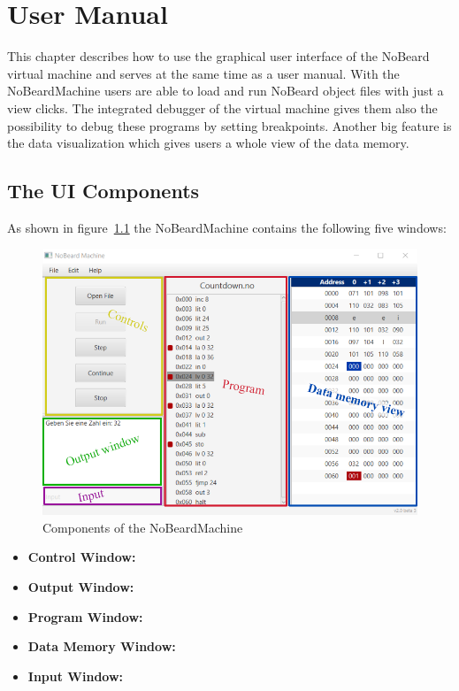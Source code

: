 \chapter{User Manual}
This chapter describes how to use the graphical user interface of the NoBeard virtual machine and serves at the same time as a user manual.
With the NoBeardMachine users are able to load and run NoBeard object files with just a view clicks. The integrated debugger of the virtual machine gives them also the possibility to debug these programs by setting breakpoints. Another big feature is the data visualization which gives users a whole view of the data memory.
\section{The UI Components}
As shown in figure~\ref{fig:components} the NoBeardMachine contains the following five windows:

\begin{figure}[h] 
	\centering
	\includegraphics[scale=.87]{images/screenshot-0.png}
	\caption{Components of the NoBeardMachine}
	\label{fig:components}
\end{figure}

\begin{itemize}
\item \textbf{Control Window: }
\item \textbf{Output Window: }
\item \textbf{Program Window: }
\item \textbf{Data Memory Window: }
\item \textbf{Input Window: }
\end{itemize}

